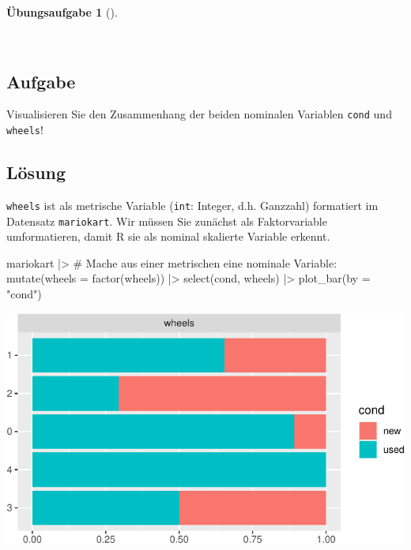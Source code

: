 \documentclass[
  a4paper,
  DIV=11]{scrreprt}
\newenvironment{Shaded}{\begin{snugshade}}{\end{snugshade}}
\newcommand{\AttributeTok}[1]{\textcolor[rgb]{0.40,0.45,0.13}{#1}}
\newcommand{\CommentTok}[1]{\textcolor[rgb]{0.37,0.37,0.37}{#1}}
\newcommand{\FunctionTok}[1]{\textcolor[rgb]{0.28,0.35,0.67}{#1}}
\newcommand{\NormalTok}[1]{\textcolor[rgb]{0.00,0.23,0.31}{#1}}
\newcommand{\SpecialCharTok}[1]{\textcolor[rgb]{0.37,0.37,0.37}{#1}}
\newcommand{\StringTok}[1]{\textcolor[rgb]{0.13,0.47,0.30}{#1}}
\theoremstyle{definition}
\newtheorem{exercise}{Übungsaufgabe}[chapter]
\theoremstyle{definition}
\theoremstyle{definition}
\theoremstyle{remark}
\begin{document}
\begin{exercise}[]\protect\hypertarget{exr-zsmnhang-cond-wheels}{}\label{exr-zsmnhang-cond-wheels}

~

\subsection{Aufgabe}

Visualisieren Sie den Zusammenhang der beiden nominalen Variablen
\texttt{cond} und \texttt{wheels}!

\subsection{Lösung}

\texttt{wheels} ist als metrische Variable (\texttt{int}: Integer, d.h.
Ganzzahl) formatiert im Datensatz \texttt{mariokart}. Wir müssen Sie
zunächst als Faktorvariable umformatieren, damit R sie als nominal
skalierte Variable erkennt.

\begin{Shaded}
\begin{Highlighting}[]
\NormalTok{mariokart }\SpecialCharTok{|\textgreater{}} 
  \CommentTok{\# Mache aus einer metrischen eine nominale Variable: }
  \FunctionTok{mutate}\NormalTok{(}\AttributeTok{wheels =} \FunctionTok{factor}\NormalTok{(wheels)) }\SpecialCharTok{|\textgreater{}} 
  \FunctionTok{select}\NormalTok{(cond, wheels) }\SpecialCharTok{|\textgreater{}} 
  \FunctionTok{plot\_bar}\NormalTok{(}\AttributeTok{by =} \StringTok{"cond"}\NormalTok{)}
\end{Highlighting}
\end{Shaded}

\includegraphics{040-verbildlichen_files/figure-pdf/unnamed-chunk-27-1.pdf}

\end{exercise}
\end{document}
